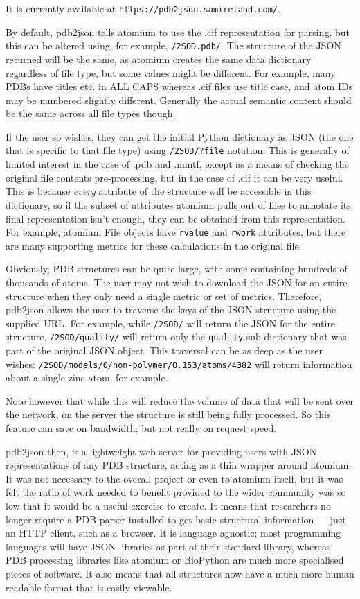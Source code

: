It is currently available at \texttt{https://pdb2json.samireland.com/}.

By default, pdb2json tells atomium to use the .cif representation for parsing, but this can be altered using, for example, \texttt{/2SOD.pdb/}. The structure of the JSON returned will be the same, as atomium creates the same data dictionary regardless of file type, but some values might be different. For example, many PDBs have titles etc. in ALL CAPS whereas .cif files use title case, and atom IDs may be numbered slightly different. Generally the actual semantic content should be the same across all file types though.

If the user so wishes, they can get the initial Python dictionary as JSON (the one that is specific to that file type) using \texttt{/2SOD/?file} notation. This is generally of limited interest in the case of .pdb and .mmtf, except as a means of checking the original file contents pre-processing, but in the case of .cif it can be very useful. This is because \emph{every} attribute of the structure will be accessible in this dictionary, so if the subset of attributes atomium pulls out of files to annotate its final representation isn't enough, they can be obtained from this representation. For example, atomium File objects have \texttt{rvalue} and \texttt{rwork} attributes, but there are many supporting metrics for these calculations in the original file.

Obviously, PDB structures can be quite large, with some containing hundreds of thousands of atoms. The user may not wish to download the JSON for an entire structure when they only need a single metric or set of metrics. Therefore, pdb2json allows the user to traverse the keys of the JSON structure using the supplied URL. For example, while \texttt{/2SOD/} will return the JSON for the entire structure, \texttt{/2SOD/quality/} will return only the \texttt{quality} sub-dictionary that was part of the original JSON object. This traversal can be as deep as the user wishes: \texttt{/2SOD/models/0/non-polymer/O.153/atoms/4382} will return information about a single zinc atom, for example.

Note however that while this will reduce the volume of data that will be sent over the network, on the server the structure is still being fully processed. So this feature can save on bandwidth, but not really on request speed.

pdb2json then, is a lightweight web server for providing users with JSON representations of any PDB structure, acting as a thin wrapper around atomium. It was not necessary to the overall project or even to atomium itself, but it was felt the ratio of work needed to benefit provided to the wider community was so low that it would be a useful exercise to create. It means that researchers no longer require a PDB parser installed to get basic structural information --- just an HTTP client, such as a browser. It is language agnostic; most programming languages will have JSON libraries as part of their standard library, whereas PDB processing libraries like atomium or BioPython are much more specialised pieces of software. It also means that all structures now have a much more human readable format that is easily viewable.

